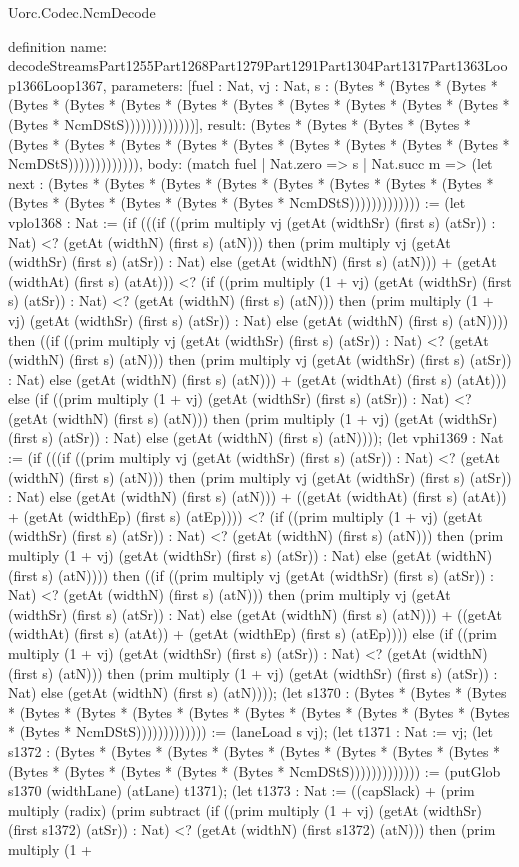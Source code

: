 \begin{lexlean}{Uorc.Codec.NcmDecode}
\begin{semanticmodule}
definition{
  name: decodeStreamsPart1255Part1268Part1279Part1291Part1304Part1317Part1363Loop1366Loop1367,
  parameters: [fuel : Nat, vj : Nat, s : (Bytes * (Bytes * (Bytes * (Bytes * (Bytes * (Bytes * (Bytes * (Bytes * (Bytes * (Bytes * (Bytes * (Bytes * (Bytes * NcmDStS)))))))))))))],
  result: (Bytes * (Bytes * (Bytes * (Bytes * (Bytes * (Bytes * (Bytes * (Bytes * (Bytes * (Bytes * (Bytes * (Bytes * (Bytes * NcmDStS))))))))))))),
  body: (match fuel
    | Nat.zero => s
    | Nat.succ m => (let next : (Bytes * (Bytes * (Bytes * (Bytes * (Bytes * (Bytes * (Bytes * (Bytes * (Bytes * (Bytes * (Bytes * (Bytes * (Bytes * NcmDStS))))))))))))) := (let vplo1368 : Nat := (if (((if ((prim multiply vj (getAt (widthSr) (first s) (atSr)) : Nat) <? (getAt (widthN) (first s) (atN))) then (prim multiply vj (getAt (widthSr) (first s) (atSr)) : Nat) else (getAt (widthN) (first s) (atN))) + (getAt (widthAt) (first s) (atAt))) <? (if ((prim multiply (1 + vj) (getAt (widthSr) (first s) (atSr)) : Nat) <? (getAt (widthN) (first s) (atN))) then (prim multiply (1 + vj) (getAt (widthSr) (first s) (atSr)) : Nat) else (getAt (widthN) (first s) (atN)))) then ((if ((prim multiply vj (getAt (widthSr) (first s) (atSr)) : Nat) <? (getAt (widthN) (first s) (atN))) then (prim multiply vj (getAt (widthSr) (first s) (atSr)) : Nat) else (getAt (widthN) (first s) (atN))) + (getAt (widthAt) (first s) (atAt))) else (if ((prim multiply (1 + vj) (getAt (widthSr) (first s) (atSr)) : Nat) <? (getAt (widthN) (first s) (atN))) then (prim multiply (1 + vj) (getAt (widthSr) (first s) (atSr)) : Nat) else (getAt (widthN) (first s) (atN)))); (let vphi1369 : Nat := (if (((if ((prim multiply vj (getAt (widthSr) (first s) (atSr)) : Nat) <? (getAt (widthN) (first s) (atN))) then (prim multiply vj (getAt (widthSr) (first s) (atSr)) : Nat) else (getAt (widthN) (first s) (atN))) + ((getAt (widthAt) (first s) (atAt)) + (getAt (widthEp) (first s) (atEp)))) <? (if ((prim multiply (1 + vj) (getAt (widthSr) (first s) (atSr)) : Nat) <? (getAt (widthN) (first s) (atN))) then (prim multiply (1 + vj) (getAt (widthSr) (first s) (atSr)) : Nat) else (getAt (widthN) (first s) (atN)))) then ((if ((prim multiply vj (getAt (widthSr) (first s) (atSr)) : Nat) <? (getAt (widthN) (first s) (atN))) then (prim multiply vj (getAt (widthSr) (first s) (atSr)) : Nat) else (getAt (widthN) (first s) (atN))) + ((getAt (widthAt) (first s) (atAt)) + (getAt (widthEp) (first s) (atEp)))) else (if ((prim multiply (1 + vj) (getAt (widthSr) (first s) (atSr)) : Nat) <? (getAt (widthN) (first s) (atN))) then (prim multiply (1 + vj) (getAt (widthSr) (first s) (atSr)) : Nat) else (getAt (widthN) (first s) (atN)))); (let s1370 : (Bytes * (Bytes * (Bytes * (Bytes * (Bytes * (Bytes * (Bytes * (Bytes * (Bytes * (Bytes * (Bytes * (Bytes * (Bytes * NcmDStS))))))))))))) := (laneLoad s vj); (let t1371 : Nat := vj; (let s1372 : (Bytes * (Bytes * (Bytes * (Bytes * (Bytes * (Bytes * (Bytes * (Bytes * (Bytes * (Bytes * (Bytes * (Bytes * (Bytes * NcmDStS))))))))))))) := (putGlob s1370 (widthLane) (atLane) t1371); (let t1373 : Nat := ((capSlack) + (prim multiply (radix) (prim subtract (if ((prim multiply (1 + vj) (getAt (widthSr) (first s1372) (atSr)) : Nat) <? (getAt (widthN) (first s1372) (atN))) then (prim multiply (1 + }
\end{semanticmodule}
\end{lexlean}
